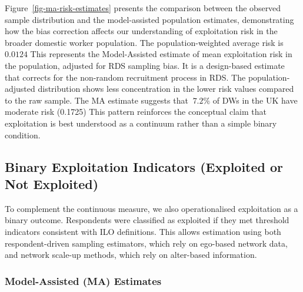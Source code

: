\documentclass[
  12pt,
  letterpaper,
  DIV=11,
  numbers=noendperiod]{scrartcl}
\theoremstyle{plain}
\theoremstyle{definition}
\begin{document}
Figure~\ref{fig-ma-risk-estimates} presents the comparison between the
observed sample distribution and the model-assisted population
estimates, demonstrating how the bias correction affects our
understanding of exploitation risk in the broader domestic worker
population. The population-weighted average risk is \(0.0124\) This
represents the Model-Assisted estimate of mean exploitation risk in the
population, adjusted for RDS sampling bias. It is a design-based
estimate that corrects for the non-random recruitment process in RDS.
The population-adjusted distribution shows less concentration in the
lower risk values compared to the raw sample. The MA estimate suggests
that \(~7.2\%\) of DWs in the UK have moderate risk (0.1725) This
pattern reinforces the conceptual claim that exploitation is best
understood as a continuum rather than a simple binary condition.

\subsection{Binary Exploitation Indicators (Exploited or Not
Exploited)}\label{binary-exploitation-indicators-exploited-or-not-exploited}

To complement the continuous measure, we also operationalised
exploitation as a binary outcome. Respondents were classified as
exploited if they met threshold indicators consistent with ILO
definitions. This allows estimation using both respondent-driven
sampling estimators, which rely on ego-based network data, and network
scale-up methods, which rely on alter-based information.

\subsubsection{Model-Assisted (MA)
Estimates}\label{model-assisted-ma-estimates}
\end{document}
